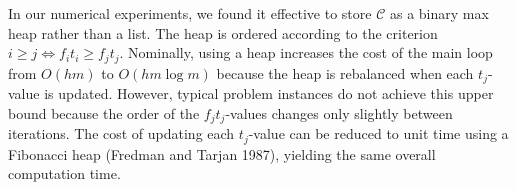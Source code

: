 \documentclass[12pt]{article} %
\newtheorem{proposition}{Proposition}
\theoremstyle{definition}
\newtheorem{proposition}{제의}
\theoremstyle{definition}
\begin{document}
In our numerical experiments, we found it effective to store $\mathcal{C}$ as a binary max heap rather than a list. The heap is ordered according to the criterion $i \geq j \iff f_i t_i \geq f_j t_j$. Nominally, using a heap increases the cost of the main loop from $O(h m)$ to $O(hm \log m)$ because the heap is rebalanced when each $t_j$-value is updated. However, typical problem instances do not achieve this upper bound because the order of the $f_j t_j$-values changes only slightly between iterations. The cost of updating each $t_j$-value can be reduced to unit time using a Fibonacci heap (Fredman and Tarjan 1987), yielding the same overall computation time. 
\end{document}
